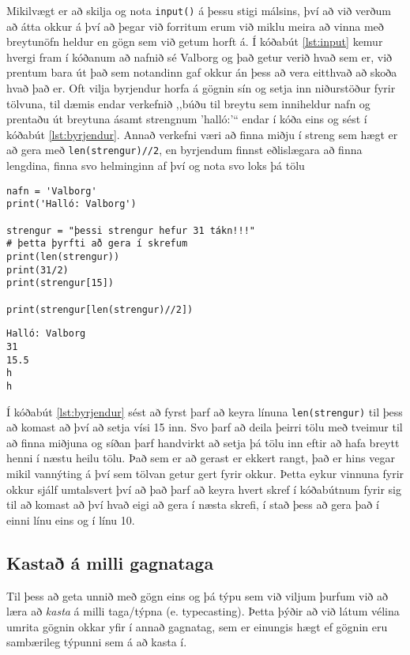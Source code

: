 Mikilvægt er að skilja og nota \texttt{input()} á þessu stigi málsins, því að við verðum að átta okkur á því að þegar við forritum erum við miklu meira að vinna með breytunöfn heldur en gögn sem við getum horft á.
Í kóðabút \ref{lst:input} kemur hvergi fram í kóðanum að nafnið sé Valborg og það getur verið hvað sem er, við prentum bara út það sem notandinn gaf okkur án þess að vera eitthvað að skoða hvað það er.
Oft vilja byrjendur horfa á gögnin sín og setja inn niðurstöður fyrir tölvuna, til dæmis endar verkefnið ,,búðu til breytu sem inniheldur nafn og prentaðu út breytuna ásamt strengnum 'halló:'“ endar í kóða eins og sést í kóðabút \ref{lst:byrjendur}.
Annað verkefni væri að finna miðju í streng sem hægt er að gera með \texttt{len(strengur)//2}, en byrjendum finnst eðlislægara að finna lengdina, finna svo helminginn af því og nota svo loks þá tölu

\begin{lstlisting}[caption=Oft forðast byrjendur að nota breytur og treysta meira á að sjá hvað ætti að koma út, label=lst:byrjendur]
nafn = 'Valborg'
print('Halló: Valborg')

strengur = "þessi strengur hefur 31 tákn!!!"
# þetta þyrfti að gera í skrefum
print(len(strengur)) 
print(31/2) 
print(strengur[15])

print(strengur[len(strengur)//2])
\end{lstlisting}
\lstset{style=uttak}
\begin{lstlisting}
Halló: Valborg
31
15.5
h
h
\end{lstlisting}
\lstset{style=venjulegt}

Í kóðabút \ref{lst:byrjendur} sést að fyrst þarf að keyra línuna \texttt{len(strengur)} til þess að komast að því að setja vísi 15 inn.
Svo þarf að deila þeirri tölu með tveimur til að finna miðjuna og síðan þarf handvirkt að setja þá tölu inn eftir að hafa breytt henni í næstu heilu tölu.
Það sem er að gerast er ekkert rangt, það er hins vegar mikil vannýting á því sem tölvan getur gert fyrir okkur.
Þetta eykur vinnuna fyrir okkur sjálf umtalsvert því að það þarf að keyra hvert skref í kóðabútnum fyrir sig til að komast að því hvað eigi að gera í næsta skrefi, í stað þess að gera það í einni línu eins og í línu 10.

\subsection{Kastað á milli gagnataga}
Til þess að geta unnið með gögn eins og þá týpu sem við viljum þurfum við að læra að \emph{kasta} á milli taga/týpna (e. typecasting).
Þetta þýðir að við látum vélina umrita gögnin okkar yfir í annað gagnatag, sem er einungis hægt ef gögnin eru sambærileg týpunni sem á að kasta í.

